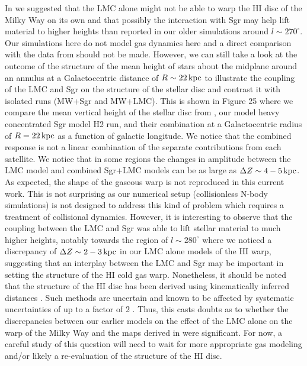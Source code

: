 \documentclass[useAMS,usenatbib]{mnras}
\begin{document}
{In \cite{laporte16} we suggested that the LMC alone might not be able to warp the HI disc of the Milky Way on its own and that possibly the interaction with Sgr may help lift material to higher heights than reported in our older simulations around $l\sim270^{\circ}$. Our simulations here do not model gas dynamics here and a direct comparison with the data from \citep{levine06} should not be made. However, we can still take a look at the outcome of the structure of the mean height of stars about the midplane around an annulus at a Galactocentric distance of $R\sim22 \,\rm{kpc}$ to illustrate the coupling of the LMC and Sgr on the structure of the stellar disc and contrast it with isolated runs (MW+Sgr and MW+LMC). This is shown in Figure 25 where we compare the mean vertical height of the stellar disc from \cite{laporte16}, our model heavy concentrated Sgr model H2 run, and their combination at a Galactocentric radius of $R=22 \,\rm{kpc}$ as a function of galactic longitude. We notice that the combined response is not a linear combination of the separate contributions from each satellite. We notice that in some regions the changes in amplitude between the LMC model and combined Sgr+LMC models can be as large as $\Delta Z\sim4-5\,\rm{kpc}$. As expected, the shape of the gaseous warp is not reproduced in this current work. This is not surprising as our numerical setup (collisionless N-body simulations) is not designed to address this kind of problem which requires a treatment of collisional dynamics. However, it is interesting to observe that the coupling between the LMC and Sgr was able to lift stellar material to much higher heights, notably towards the region of $l\sim280^{\circ}$ where we noticed a discrepancy of $\Delta Z\sim2-3 \,\rm{kpc}$ in our LMC alone models of the HI warp, suggesting that an interplay between the LMC and Sgr may be important in setting the structure of the HI cold gas warp. Nonetheless, it should be noted that the structure of the HI disc has been derived using kinematically inferred distances \citep{levine06}. Such methods are uncertain and known to be affected by systematic uncertainties of up to a factor of 2 \citep{reid14}. Thus, this casts doubts as to whether the discrepancies between our earlier models on the effect of the LMC alone on the warp of the Milky Way \citep{laporte16} and the maps derived in \cite{levine06} were significant. For now, a careful study of this question will need to wait for more appropriate gas modeling and/or likely a re-evaluation of the structure of the HI disc.


}
\end{document}
